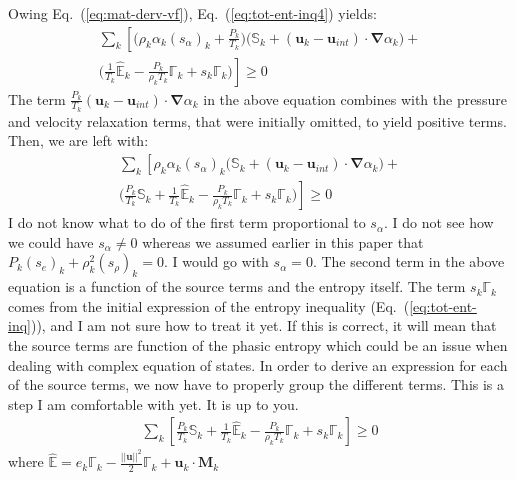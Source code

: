 \documentclass[preprint,10pt]{elsarticle}
\newcommand{\grad}{\mbold{\nabla}}
\newcommand{\mbold}[1]{\boldsymbol#1}
\newcommand{\eqt}[1]{Eq.~(\ref{#1})}                     %
\begin{document}
%
Owing \eqt{eq:mat-derv-vf}, \eqt{eq:tot-ent-inq4} yields:
%
\begin{multline}\label{eq:tot-ent-inq5}
\sum_k \left[  \Big ( \rho_k\alpha_k (s_\alpha)_k + \frac{P_k}{T_k} \Big ) \Big ( \mathbb{S}_k + (\mbold u_k - \mbold u_{int} ) \cdot \grad \alpha_k \Big)  + \right. \\ \left. \Big  ( \frac{1}{T_k} \mathbb{\hat{E}}_k -\frac{P_k}{\rho_kT_k} \mathbb{\Gamma}_k + s_k \mathbb{\Gamma}_k \Big ) \right] \geq 0
\end{multline}
%
The term $\frac{P_k}{T_k} (\mbold u_k - \mbold u_{int} ) \cdot \grad \alpha_k$ in the above equation combines with the pressure and velocity relaxation terms, that were initially omitted, to yield positive terms. Then, we are left with:
%
\begin{multline}\label{eq:tot-ent-inq6}
\sum_k \left[  \rho_k\alpha_k (s_\alpha)_k \Big ( \mathbb{S}_k + (\mbold u_k - \mbold u_{int} ) \cdot \grad \alpha_k \Big)  + \right. \\ \left. \Big  ( \frac{P_k}{T_k}\mathbb{S}_k + \frac{1}{T_k} \mathbb{\hat{E}}_k -\frac{P_k}{\rho_kT_k} \mathbb{\Gamma}_k + s_k \mathbb{\Gamma}_k \Big ) \right] \geq 0
\end{multline}
%
I do not know what to do of the first term proportional to $s_\alpha$. I do not see how we could have $s_\alpha \neq  0$ whereas we assumed earlier in this paper that $P_k (s_e)_k + \rho_k^2 (s_\rho)_k = 0$. I would go with $s_\alpha = 0$. The second term in the above equation is a function of the source terms and the entropy itself. The term $s_k \mathbb{\Gamma}_k$ comes from the initial expression of the entropy inequality (\eqt{eq:tot-ent-inq}), and I am not sure how to treat it yet. If this is correct, it will mean that the source terms are function of the phasic entropy which could be an issue when dealing with complex equation of states. In order to derive an expression for each of the source terms, we now have to properly group the different terms. This is a step I am comfortable with yet. It is up to you.
%
\begin{align}\label{eq:tot-ent-inq7}
\sum_k \left[ \frac{P_k}{T_k}\mathbb{S}_k + \frac{1}{T_k} \mathbb{\hat{E}}_k -\frac{P_k}{\rho_kT_k} \mathbb{\Gamma}_k + s_k \mathbb{\Gamma}_k \right] \geq 0
\end{align}
%
where $\mathbb{\hat{E}} = e_k \mathbb{\Gamma}_k - \frac{|| \mbold u ||^2}{2} \mathbb{\Gamma}_k + \mbold u_k \cdot \mathbb{\mbold M}_k$
\end{document}

